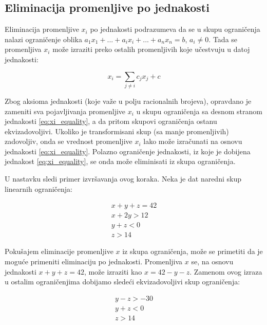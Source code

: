 \documentclass[a4paper,10pt]{article}
\begin{document}
\subsection{Eliminacija promenljive po jednakosti}

Eliminacija promenljive $x_i$ po jednakosti podrazumeva da se u skupu ograničenja nalazi ograničenje oblika $a_1x_1 + ... + a_ix_i + ... + a_nx_n= b$, $a_i \ne 0$. Tada se promenljiva $x_i$ može izraziti preko ostalih promenljivih koje učestvuju u datoj jednakosti:

\begin{equation}
    \label{eq:xi_equality}
    x_i = \sum_{j \ne i}{c_jx_j + c}
\end{equation}

Zbog aksioma jednakosti (koje važe u polju racionalnih brojeva), opravdano je zameniti sva pojavljivanja promenljive $x_i$ u skupu ograničenja sa desnom stranom jednakosti \eqref{eq:xi_equality}, a da pritom skupovi ograničenja ostanu ekvizadovoljivi. Ukoliko je transformisani skup (sa manje promenljivih) zadovoljiv, onda se vrednost promenljive $x_i$ lako može izračunati na osnovu jednakosti \eqref{eq:xi_equality}. Polazno ograničenje jednakosti, iz koje je dobijena jednakost \eqref{eq:xi_equality}, se onda može eliminisati iz skupa ograničenja.

U nastavku sledi primer izvršavanja ovog koraka. Neka je dat naredni skup linearnih ograničenja:

\begin{equation}
\begin{gathered}
    \label{eq:example_s_1}
    x + y + z = 42 \\
    x + 2y > 12 \\
    y + z < 0 \\
    z > 14
\end{gathered}
\end{equation}

Pokušajem eliminacije promenljive $x$ iz skupa ograničenja, može se primetiti da je moguće primeniti eliminaciju po jednakosti. Promenljiva $x$ se, na osnovu jednakosti $x + y + z = 42$, može izraziti kao $x = 42 - y - z$. Zamenom ovog izraza u ostalim ograničenjima dobijamo sledeći ekvizadovoljivi skup ograničenja:


\begin{equation}
\begin{gathered}
    \label{eq:example_s_2}
    y - z > -30 \\
    y + z < 0 \\
    z > 14
\end{gathered}
\end{equation}
\end{document}
